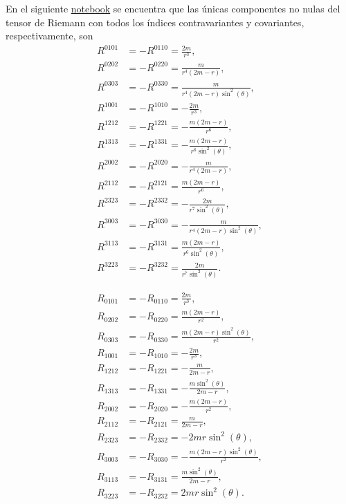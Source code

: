 \documentclass[letterpaper,11pt]{article}
\begin{document}
En el siguiente \href{https://github.com/AleSaa66/Topicos-RG/blob/main/Semana%209/Semana-9.ipynb}{notebook} se encuentra que las únicas componentes no nulas del tensor de Riemann con todos los índices contravariantes y covariantes, respectivamente, son
\begingroup
\allowdisplaybreaks
\begin{align}
R^{0101} &= - R^{0110} = \frac{2m}{r^3}, \\
R^{0202} &= - R^{0220} = \frac{m}{r^4(2m - r)}, \\
R^{0303} &= - R^{0330} = \frac{m}{r^4(2m - r)\sin^2(\theta)}, \\
R^{1001} &= - R^{1010} = - \frac{2m}{r^3}, \\
R^{1212} &= - R^{1221} = - \frac{m(2m-r)}{r^6}, \\
R^{1313} &= - R^{1331} = - \frac{m(2m-r)}{r^6\sin^2(\theta)}, \\
R^{2002} &= - R^{2020} = - \frac{m}{r^4(2m-r)}, \\
R^{2112} &= - R^{2121} = \frac{m(2m-r)}{r^6}, \\
R^{2323} &= - R^{2332} = - \frac{2m}{r^7\sin^2(\theta)}, \\
R^{3003} &= - R^{3030} = - \frac{m}{r^4(2m-r)\sin^2(\theta)}, \\
R^{3113} &= - R^{3131} = \frac{m(2m-r)}{r^6\sin^2(\theta)}, \\
R^{3223} &= - R^{3232} = \frac{2m}{r^7\sin^2(\theta)}.
\end{align}
\endgroup

\begin{align}
R_{0101} &= - R_{0110} = \frac{2m}{r^3}, \\
R_{0202} &= - R_{0220} = \frac{m(2m-r)}{r^2}, \\
R_{0303} &= - R_{0330} = \frac{m(2m-r)\sin^2(\theta)}{r^2}, \\
R_{1001} &= - R_{1010} = - \frac{2m}{r^3}, \\
R_{1212} &= - R_{1221} = - \frac{m}{2m - r}, \\
R_{1313} &= - R_{1331} = - \frac{m \sin^2(\theta)}{2m-r}, \\
R_{2002} &= - R_{2020} =  - \frac{m(2m-r)}{r^2}, \\
R_{2112} &= - R_{2121} = \frac{m}{2m-r}, \\
R_{2323} &= - R_{2332} = - 2m r \sin^2(\theta), \\
R_{3003} &= - R_{3030} = - \frac{m(2m-r)\sin^2(\theta)}{r^2}, \\
R_{3113} &= - R_{3131} = \frac{m \sin^2(\theta)}{2m-r}, \\
R_{3223} &= - R_{3232} = 2mr \sin^2(\theta).
\end{align}
\end{document}
